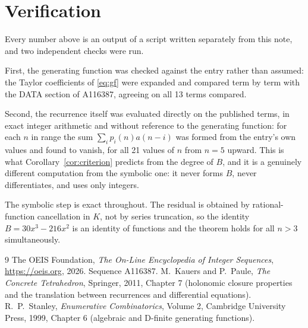 \documentclass[11pt,a4paper]{article}
\theoremstyle{plain}
\theoremstyle{definition}
\begin{document}
\section{Verification}

Every number above is an output of a script written separately from this note, and two
independent checks were run.

First, the generating function was checked against the entry rather than assumed: the
Taylor coefficients of \eqref{eq:gf} were expanded and compared term by term with the DATA
section of A116387, agreeing on all 13 terms compared.

Second, the recurrence itself was evaluated directly on the published terms, in exact
integer arithmetic and without reference to the generating function: for each $n$ in range
the sum $\sum_{i}p_{i}(n)a(n-i)$ was formed from the entry's own values and found to
vanish, for all 21 values of $n$ from $n=5$ upward. This is what
Corollary~\ref{cor:criterion} predicts from the degree of $B$, and it is a genuinely
different computation from the symbolic one: it never forms $B$, never differentiates, and
uses only integers.

The symbolic step is exact throughout. The residual is obtained by rational-function
cancellation in $K$, not by series truncation, so the identity $B=30 x^{3} - 216 x^{2}$ is an
identity of functions and the theorem holds for all $n>3$ simultaneously.

\begin{thebibliography}{9}
 The OEIS Foundation, \emph{The On-Line Encyclopedia of Integer Sequences},
\url{https://oeis.org}, 2026. Sequence A116387.
 M.~Kauers and P.~Paule, \emph{The Concrete Tetrahedron}, Springer, 2011,
Chapter 7 (holonomic closure properties and the translation between recurrences and
differential equations).
 R.~P.~Stanley, \emph{Enumerative Combinatorics}, Volume 2, Cambridge
University Press, 1999, Chapter 6 (algebraic and D-finite generating functions).
\end{thebibliography}
\end{document}
